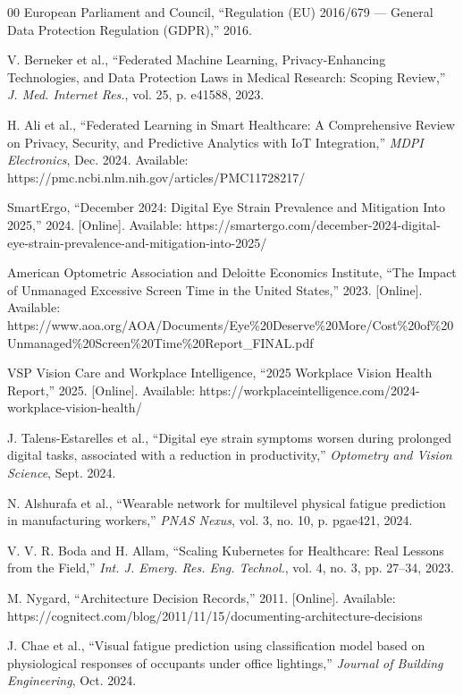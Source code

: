 \documentclass[conference]{IEEEtran}
\begin{document}
\begin{thebibliography}{00}
European Parliament and Council,
``Regulation (EU) 2016/679 — General Data Protection Regulation (GDPR),'' 2016.

V. Berneker et al.,
``Federated Machine Learning, Privacy-Enhancing Technologies, and Data Protection Laws
in Medical Research: Scoping Review,''
\textit{J. Med. Internet Res.}, vol. 25, p. e41588, 2023.

H. Ali et al.,
``Federated Learning in Smart Healthcare: A Comprehensive Review on Privacy, Security,
and Predictive Analytics with IoT Integration,''
\textit{MDPI Electronics}, Dec. 2024.
Available: https://pmc.ncbi.nlm.nih.gov/articles/PMC11728217/

SmartErgo,
``December 2024: Digital Eye Strain Prevalence and Mitigation Into 2025,'' 2024.
[Online].
Available: https://smartergo.com/december-2024-digital-eye-strain-prevalence-and-mitigation-into-2025/

American Optometric Association and Deloitte Economics Institute,
``The Impact of Unmanaged Excessive Screen Time in the United States,'' 2023.
[Online]. Available: https://www.aoa.org/AOA/Documents/Eye\%20Deserve\%20More/Cost\%20of\%20Unmanaged\%20Screen\%20Time\%20Report\_FINAL.pdf

VSP Vision Care and Workplace Intelligence,
``2025 Workplace Vision Health Report,'' 2025. [Online].
Available: https://workplaceintelligence.com/2024-workplace-vision-health/

J. Talens-Estarelles et al.,
``Digital eye strain symptoms worsen during prolonged digital tasks, associated with
a reduction in productivity,''
\textit{Optometry and Vision Science}, Sept. 2024.

N. Alshurafa et al.,
``Wearable network for multilevel physical fatigue prediction in manufacturing workers,''
\textit{PNAS Nexus}, vol. 3, no. 10, p. pgae421, 2024.

V. V. R. Boda and H. Allam,
``Scaling Kubernetes for Healthcare: Real Lessons from the Field,''
\textit{Int. J. Emerg. Res. Eng. Technol.}, vol. 4, no. 3, pp. 27--34, 2023.

M. Nygard,
``Architecture Decision Records,'' 2011. [Online].
Available: https://cognitect.com/blog/2011/11/15/documenting-architecture-decisions

J. Chae et al.,
``Visual fatigue prediction using classification model based on physiological responses
of occupants under office lightings,''
\textit{Journal of Building Engineering}, Oct. 2024.


\end{thebibliography}
\end{document}
